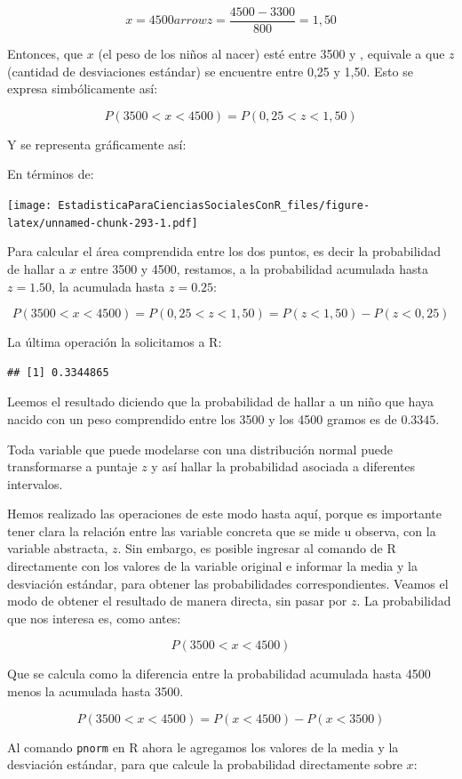 \documentclass[]{book}
\begin{document}
\[x = 4500arrow z = \frac{4500 - 3300}{800} = 1,50\]

Entonces, que \(x\) (el peso de los niños al nacer) esté entre 3500 y ,
equivale a que \(z\) (cantidad de desviaciones estándar) se encuentre
entre 0,25 y 1,50. Esto se expresa simbólicamente así:

\[P(3500 < x < 4500) = P(0,25 < z < 1,50)\]

Y se representa gráficamente así:

En términos de:

\texttt{[image: EstadisticaParaCienciasSocialesConR\_files/figure-latex/unnamed-chunk-293-1.pdf]}

Para calcular el área comprendida entre los dos puntos, es decir la
probabilidad de hallar a \(x\) entre 3500 y 4500, restamos, a la
probabilidad acumulada hasta \(z=1.50\), la acumulada hasta \(z=0.25\):

\[P(3500 < x < 4500) = P(0,25 < z < 1,50) = P(z < 1,50) - P(z < 0,25)\]

La última operación la solicitamos a R:

\begin{verbatim}
## [1] 0.3344865
\end{verbatim}

Leemos el resultado diciendo que la probabilidad de hallar a un niño que haya nacido con un peso comprendido entre los 3500 y los 4500 gramos es de \(0.3345\).

Toda variable que puede modelarse con una distribución normal puede
transformarse a puntaje \(z\) y así hallar la probabilidad asociada a
diferentes intervalos.

Hemos realizado las operaciones de este modo hasta aquí, porque es importante tener clara la relación entre las variable concreta que se mide u observa, con la variable abstracta, \(z\). Sin embargo, es posible ingresar al comando de R directamente con los valores de la variable original e informar la media y la desviación estándar, para obtener las probabilidades correspondientes. Veamos el modo de obtener el resultado de manera directa, sin pasar por \(z\). La
probabilidad que nos interesa es, como antes:

\[P(3500 < x < 4500)\]

Que se calcula como la diferencia entre la probabilidad acumulada hasta
4500 menos la acumulada hasta 3500.

\[P(3500 < x < 4500) = P(x < 4500) - P(x < 3500)\]

Al comando \texttt{pnorm} en R ahora le agregamos los valores de la media y la desviación estándar, para que calcule la probabilidad directamente sobre \(x\):
\end{document}

